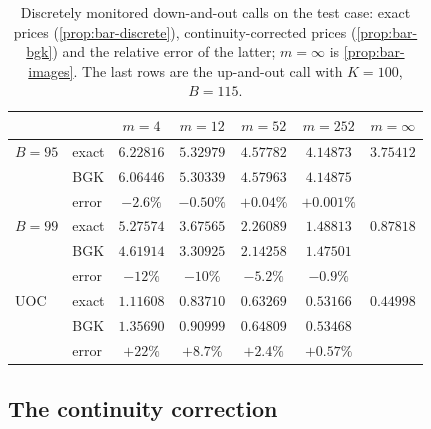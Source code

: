 \begin{table}[ht]
\centering
\small
\caption{Discretely monitored down-and-out calls on the test case: exact prices
  (\cref{prop:bar-discrete}), continuity-corrected prices (\cref{prop:bar-bgk}) and the relative
  error of the latter; $m=\infty$ is \cref{prop:bar-images}. The last rows are the up-and-out call
  with $K=100$, $B=115$.}
\label{tab:bar-discrete}
\begin{tabular}{@{}llccccc@{}}
\toprule
& & $m=4$ & $m=12$ & $m=52$ & $m=252$ & $m=\infty$\\
\midrule
$B=95$ & exact & $6.22816$ & $5.32979$ & $4.57782$ & $4.14873$ & $3.75412$\\
& BGK & $6.06446$ & $5.30339$ & $4.57963$ & $4.14875$ & \\
& error & $-2.6\%$ & $-0.50\%$ & $+0.04\%$ & $+0.001\%$ & \\
$B=99$ & exact & $5.27574$ & $3.67565$ & $2.26089$ & $1.48813$ & $0.87818$\\
& BGK & $4.61914$ & $3.30925$ & $2.14258$ & $1.47501$ & \\
& error & $-12\%$ & $-10\%$ & $-5.2\%$ & $-0.9\%$ & \\

UOC & exact & $1.11608$ & $0.83710$ & $0.63269$ & $0.53166$ & $0.44998$\\
& BGK & $1.35690$ & $0.90999$ & $0.64809$ & $0.53468$ & \\
& error & $+22\%$ & $+8.7\%$ & $+2.4\%$ & $+0.57\%$ & \\
\bottomrule
\end{tabular}
\end{table}

\subsection{The continuity correction}

